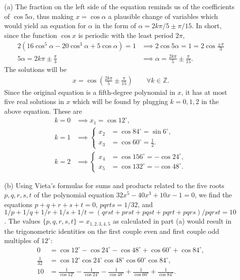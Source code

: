 \begin{solution}[name=Solution by Parviz Shahriari]
\begin{itemize}
    \item[(a)] The fraction on the left side of the equation reminds us of the coefficients of $\cos 5\alpha$, thus making $x=\cos \alpha$ a plausible change of variables which would yield an equation for $\alpha$ in the form of $\alpha = 2k\pi/5 \pm \pi/15$. In short, since the function $\cos x$ is periodic with the least period $2\pi$,
    \begin{align*}
        2(16\cos^5 \alpha - 20\cos^3\alpha + 5\cos \alpha) = 1 &\implies 2\cos 5 \alpha = 1 = 2\cos \frac{\pm \pi}{3}\\ 5\alpha = 2k\pi \pm \frac{\pi}{3} &\implies \alpha = \frac{2k\pi}{5}\pm\frac{\pi}{15}.
    \end{align*}
    The solutions will be
    \begin{align*}
        x=\cos\left(\frac{2k\pi}{5}\pm\frac{\pi}{15}\right) \qquad \forall k \in \mathbb Z.
    \end{align*}
    Since the original equation is a fifth-degree polynomial in $x$, it has at most five real solutions in $x$ which will be found by plugging $k=0,1,2$ in the above equation. These are
    \begin{align*}
        k=0 & \implies x_1 = \cos 12^\circ,\\
        k=1 & \implies \begin{cases}
         x_2 &= \cos 84^\circ = \sin 6^\circ,\\
         x_3 &= \cos 60^\circ = \frac{1}{2}.
        \end{cases}\\
        k=2 & \implies \begin{cases}
         x_4 &= \cos 156^\circ = -\cos 24^\circ,\\
         x_5 &= \cos 132^\circ = -\cos 48^\circ.
        \end{cases}
    \end{align*}
    \item[(b)] Using Vieta's formulas for sums and products related to the five roots $p,q,r,s,t$ of the polynomial equation $32x^5 - 40x^3 + 10x-1 = 0$, we find the equations $p+q+r+s+t=0$, $pqrts=1/32$, and $1/p + 1/q + 1/r + 1/s + 1/t = (qrst+prst+pqst+pqrt+pqrs)/pqrst = 10$. The values $\{p,q,r,s,t\}=x_{1,2,3,4,5}$ as calculated in part (a) would result in the trigonometric identities on the first couple even and first couple odd multiples of $12^\circ$:
    \begin{align*}
        0 &= \cos 12^\circ - \cos 24^\circ - \cos 48^\circ + \cos 60^\circ + \cos 84^\circ,\\
        \frac{1}{32} &= \cos 12^\circ \cos 24^\circ \cos 48^\circ \cos 60^\circ \cos 84^\circ,\\
        10 &= \frac{1}{\cos 12^\circ} -\frac{1}{\cos 24^\circ}-\frac{1}{\cos 48^\circ} + \frac{1}{\cos 60^\circ} +\frac{1}{\cos 84^\circ}.
    \end{align*}
\end{itemize}
\end{solution}



